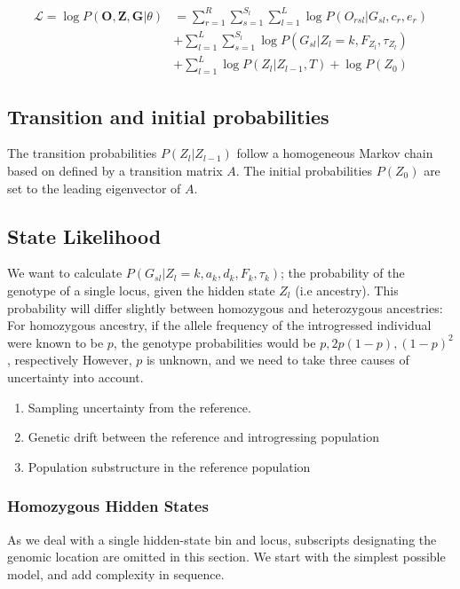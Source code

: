 \documentclass[10pt,a4paper]{article}
\newcommand{\BFZ}{\mathbf{Z}}
\newcommand{\BFG}{\mathbf{G}}
\newcommand{\BFO}{\mathbf{O}}
\begin{document}
\begin{align}
\mathcal{L}  = \log P(\BFO, \BFZ, \BFG | \theta) &= \sum_{r=1}^R\sum_{s=1}^{S_l}\sum_{l=1}^L \log P(O_{rsl} | G_{sl}, c_r, e_r)\nonumber\\
&+ \sum_{l=1}^L \sum_{s=1}^{S_l} \log P(G_{sl} | Z_l = k, F_{Z_l}, \tau_{Z_l})\nonumber\\
&+ \sum_{l=1}^L  \log P(Z_l |Z_{l-1}, T) +\log P(Z_0) 
\label{eq:ll:correct}
\end{align}


\subsection*{Transition and initial probabilities}
The transition probabilities $P(Z_l|Z_{l-1})$ follow a homogeneous Markov chain based on defined by a transition matrix $A$. The initial probabilities $P(Z_0)$ are set to the leading eigenvector of $A$.
\subsection{State Likelihood}
We want to calculate $P(G_{sl}|Z_l=k, a_k, d_k, F_k, \tau_k)$; the probability of the genotype of a single locus, given the hidden state $Z_l$ (i.e ancestry). This probability will differ slightly between homozygous and heterozygous ancestries: For homozygous ancestry, if the allele frequency of the introgressed individual were known to be $p$, the genotype probabilities would be $p, 2p(1-p), (1-p)^2$, respectively However, $p$ is unknown, and we need to take three causes of uncertainty into account.
\begin{enumerate}
	\item Sampling uncertainty from the reference.	
	\item Genetic drift between the reference and introgressing population
	\item Population substructure in the reference population
\end{enumerate}


\subsubsection{Homozygous Hidden States}
As we deal with a single hidden-state bin and locus, subscripts designating the genomic location are omitted in this section. We start with the simplest possible model, and add complexity in sequence.
\end{document}

